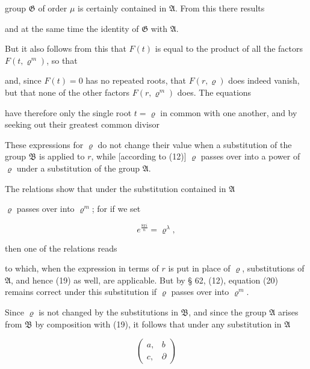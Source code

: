 group $\mathfrak{G}$ of order $\mu$ is certainly contained in $\mathfrak{A}$. From this there results


and at the same time the identity of $\mathfrak{G}$ with $\mathfrak{A}$.

But it also follows from this that $F(t)$ is equal to the product of all the factors $F(t,\varrho^m)$, so that


and, since $F(t) = 0$ has no repeated roots, that $F(r,\varrho)$ does indeed vanish, but that none of the other factors $F(r,\varrho^m)$ does. The equations


have therefore only the single root $t = \varrho$ in common with one another, and by seeking out their greatest common divisor 

These expressions for $\varrho$ do not change their value when a substitution of the group $\mathfrak{B}$ is applied to $r$, while [according to (12)] $\varrho$ passes over into a power of $\varrho$ under a substitution of the group $\mathfrak{A}$.

The  relations show that under the substitution contained in $\mathfrak{A}$


$\varrho$ passes over into $\varrho^m$; for if we set

\[
e^{\frac{8\pi i}{n}} = \varrho^\lambda,
\]

then one of the  relations reads


to which, when the expression in terms of $r$ is put in place of $\varrho$,  substitutions of $\mathfrak{A}$, and hence (19) as well, are applicable. But by § 62, (12), equation (20) remains correct under this substitution  if $\varrho$ passes over into $\varrho^m$.

Since $\varrho$ is not changed by the substitutions in $\mathfrak{B}$, and since the group $\mathfrak{A}$ arises from $\mathfrak{B}$ by composition with (19), it follows that under any substitution in $\mathfrak{A}$

\[
\begin{pmatrix} a, & b \\ c, & \partial \end{pmatrix}
\]
